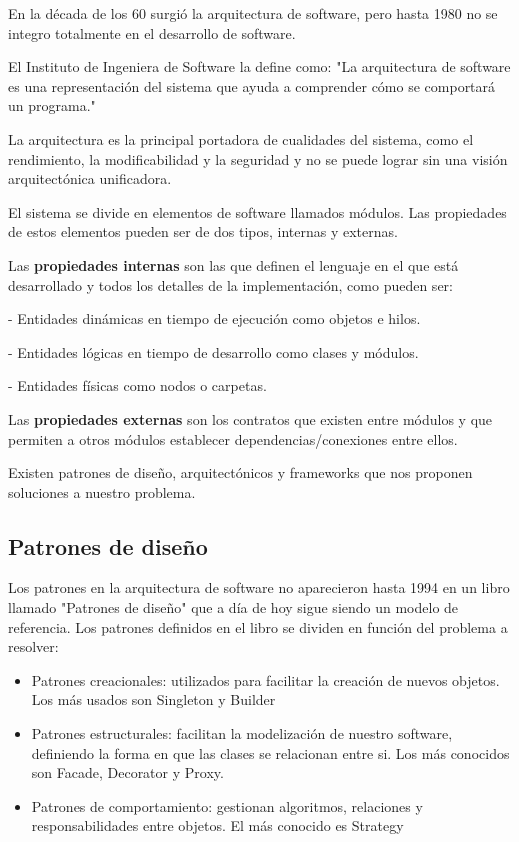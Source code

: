 \documentclass[12pt]{report} %
\begin{document}
	En la década de los 60 surgió la arquitectura de software, pero hasta 1980 no se integro totalmente en el desarrollo de software. 
	
	El Instituto de Ingeniera de Software la define como:
	"La arquitectura de software es una representación del sistema que ayuda a comprender cómo se comportará un programa." 
	
	La arquitectura es la principal portadora de cualidades del sistema, como el rendimiento, la modificabilidad y la seguridad y no se puede lograr sin una visión arquitectónica unificadora.
	
	El sistema se divide en elementos de software llamados módulos. Las propiedades de estos elementos pueden ser de dos tipos, internas y externas.
	
	Las \textbf{propiedades internas}  son las que definen el lenguaje en el que está desarrollado y todos los detalles de la implementación, como pueden ser:
	
	- Entidades dinámicas en tiempo de ejecución como objetos e hilos.
	
	- Entidades lógicas en tiempo de desarrollo como clases y módulos.
	
	- Entidades físicas como nodos o carpetas.	
	
	Las \textbf{propiedades externas} son los contratos que existen entre módulos y que permiten a otros módulos establecer dependencias/conexiones entre ellos.
	
	Existen patrones de diseño, arquitectónicos y frameworks que nos proponen soluciones a nuestro problema.
	
	\subsection{Patrones de diseño}
	
	Los patrones en la arquitectura de software no aparecieron hasta 1994 en un libro llamado "Patrones de diseño" que a día de hoy sigue siendo un modelo de referencia.		 
	Los patrones definidos en el libro se dividen en función del problema a resolver:
	 
	 \begin{itemize}
	 	\item Patrones creacionales: utilizados para facilitar la creación de nuevos objetos. Los más usados son Singleton y Builder
	 	\item Patrones estructurales: facilitan la modelización de nuestro software, definiendo la forma en que las clases se relacionan entre si. Los más conocidos son Facade, Decorator y Proxy.
 	 	\item Patrones de comportamiento: gestionan algoritmos, relaciones y responsabilidades entre objetos. El más conocido es Strategy 	
	 \end{itemize}
 
\end{document}

